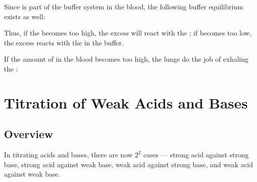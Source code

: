 			Since  is part of the buffer system in the blood, the following buffer equilibrium exists as well:



			Thus, if the \pH{} becomes too high, the excess  will react with the ; if \pH{} becomes too low, the
			excess  reacts with the  in the buffer.



			If the amount of  in the blood becomes too high, the lungs do the job of exhaling the :







	\pagebreak
	\section{Titration of Weak Acids and Bases}

		\subsection{Overview}

			In titrating acids and bases, there are now $2^2$ cases --- strong acid against strong base, strong acid against weak base,
			weak acid against strong base, and weak acid against weak base.

